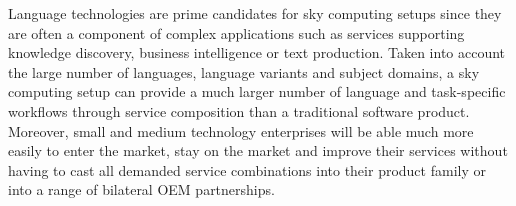 \documentclass[10pt, plain]{../../metanetpaper}
\begin{document}
\begin{multicols}{2}
Language technologies are prime candidates for sky computing setups since they are often a component of complex applications such as services supporting knowledge discovery, business intelligence or text production. Taken into account the large number of languages, language variants and subject domains, a sky computing setup can provide a much larger number of language and task-specific workflows through service composition than a traditional software product. Moreover, small and medium technology enterprises will be able much more easily to enter the market, stay on the market and improve their services without having to cast all demanded service combinations into their product family or into a range of bilateral OEM partnerships.
\end{multicols}

\clearpage


\end{document}
